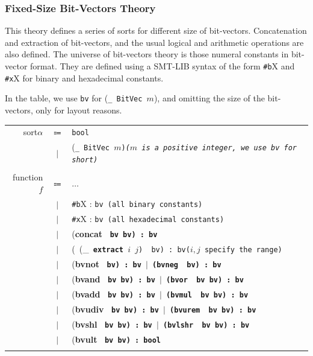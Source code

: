 \documentclass[10pt,twocolumn,letter]{article}
\theoremstyle{definition}
\begin{document}
\subsubsection{Fixed-Size Bit-Vectors Theory}
This theory defines a series of sorts for different size of bit-vectors. Concatenation and extraction of bit-vectors, and the usual logical and arithmetic operations are also defined. The universe of bit-vectors theory is those numeral constants in bit-vector format. They are defined using a SMT-LIB syntax of the form {\tt \#b}X and {\tt \#x}X for binary and hexadecimal constants.

In the table, we use {\tt bv} for ({\tt \_\ BitVec $m$}), and omitting the size of the bit-vectors, only for layout reasons.


\begin{table}[!h]
\begin{mdframed}
\centering
\begin{tabular}{r c l}
sort\qquad $\alpha$ & $\Coloneqq$ & \tt bool \\
& $\mid$ & \rm(\tt \_\ BitVec $m$\rm)\it\quad \rm($m$ \rm is a positive integer, we use {\tt bv} for short)\\
\\
function\qquad $f$ & $\Coloneqq$ & $\ldots$ \\
& $\mid$ & {\tt \#b}X \rm : \tt bv \rm\qquad (all binary constants)\\
& $\mid$ & {\tt \#x}X \rm : \tt bv \rm\qquad (all hexadecimal constants)\\
& $\mid$ & (\bf concat \tt\ bv bv\rm) : \tt bv \\
& $\mid$ & \rm(\ (\_\tt\ {\bf extract}\ $i$\ $j$\rm) \tt\ bv\rm) : \tt bv\rm\qquad ($i, j$ specify the range)\\
& $\mid$ & (\bf bvnot \tt\ bv\rm) : \tt bv \rm$\mid$ (\bf bvneg \tt\ bv\rm) : \tt bv \\
& $\mid$ & (\bf bvand \tt\ bv bv\rm) : \tt bv \rm$\mid$ (\bf bvor \tt\ bv bv\rm) : \tt bv \\
& $\mid$ & (\bf bvadd \tt\ bv bv\rm) : \tt bv \rm$\mid$ (\bf bvmul \tt\ bv bv\rm) : \tt bv \\
& $\mid$ & (\bf bvudiv \tt\ bv bv\rm) : \tt bv \rm$\mid$ (\bf bvurem \tt\ bv bv\rm) : \tt bv \\
& $\mid$ & (\bf bvshl \tt\ bv bv\rm) : \tt bv \rm$\mid$ (\bf bvlshr \tt\ bv bv\rm) : \tt bv \\
& $\mid$ & (\bf bvult \tt\ bv bv\rm) : \tt bool \\
\\

\end{tabular}
\end{mdframed}
\end{table}
\end{document}
